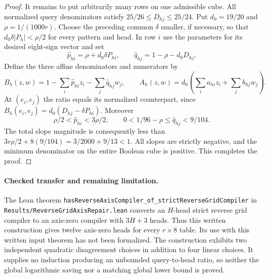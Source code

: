 \documentclass[11pt]{article}
\begin{document}
\begin{proof}
It remains to put arbitrarily many rows on one admissible cube. All
normalized query denominators satisfy
$25/26\leq D_{hj}\leq25/24$. Put
$d_0=19/20$ and $\rho=1/(1000r)$. Choose the preceding common
$\delta$ smaller, if necessary, so that
$d_0\delta|P_h|<\rho/2$ for every pattern and head.
In row $i$ use the parameters for its desired eight-sign vector and set
\[
 \widehat p_{hi}=\rho+d_0\delta P_{hi},\qquad
 \widehat q_{hj}=1-\rho-d_0D_{hj}.
\]
Define the three affine denominators and numerators by
\[
 B_h(z,w)=1-\sum_i\widehat p_{hi}z_i-\sum_j\widehat q_{hj}w_j,
 \qquad
 A_h(z,w)=d_0\left(\sum_i a_{hi}z_i+\sum_jb_{hj}w_j\right).
\]
At $(e_i,e_j)$ the ratio equals its normalized counterpart, since
$B_h(e_i,e_j)=d_0(D_{hj}-\delta P_{hi})$.
Moreover
\[
 \rho/2<\widehat p_{hi}<3\rho/2,
 \qquad 0<1/96-\rho\leq\widehat q_{hj}<9/104.
\]
The total slope magnitude is consequently less than
$3r\rho/2+8(9/104)=3/2000+9/13<1$.
All slopes are strictly negative, and the minimum denominator on the
entire Boolean cube is positive. This completes the proof.
\end{proof}

\paragraph{Checked transfer and remaining limitation.}
The Lean theorem
\texttt{hasReverseAxisCompiler\_of\_strictReverseGridCompiler}
in \texttt{Results/ReverseGridAxisRepair.lean} converts an $H$-head
strict reverse grid compiler to an axis-zero compiler with $3H+3$ heads.
Thus this written construction gives twelve axis-zero heads for every
$r\times8$ table. Its use with this written input theorem has not been
formalized. The construction exhibits two independent quadratic
disagreement choices in addition to four linear choices. It supplies no
induction producing an unbounded query-to-head ratio, so neither the
global logarithmic saving nor a matching global lower bound is proved.
\end{document}
